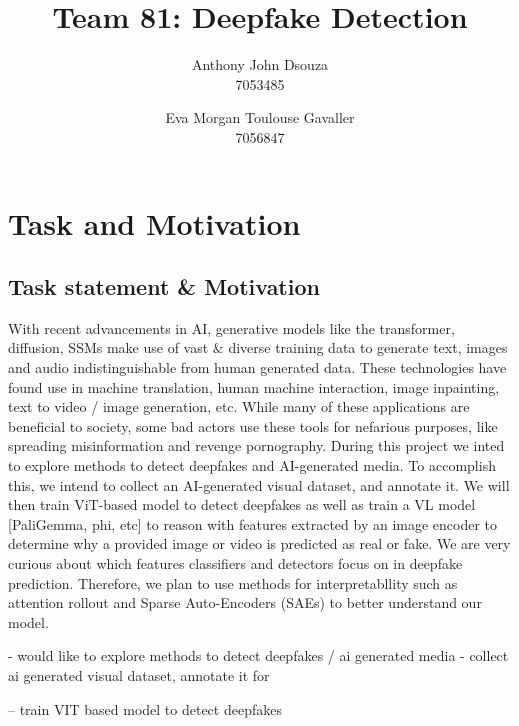 \documentclass[10pt,twocolumn,letterpaper]{article}
\begin{document}
\title{Team 81: Deepfake Detection}

\author{
Anthony John Dsouza\\
7053485\\
\and
Eva Morgan Toulouse Gavaller\\
7056847\\
}
\maketitle

\section{Task and Motivation}
\subsection{Task statement \& Motivation}
With recent advancements in AI, generative models like the transformer, diffusion, SSMs make use of vast \& diverse training data to generate text, images and audio indistinguishable from human generated data. These technologies have found use in machine translation, human machine interaction, image inpainting, text to video / image generation, etc. While many of these applications are beneficial to society, some bad actors use these tools for nefarious purposes, like spreading misinformation and revenge pornography. 
During this project we inted to explore methods to detect deepfakes and AI-generated media. To accomplish this, we intend to collect an AI-generated visual dataset, and annotate it. We will then train ViT-based model to detect deepfakes as well as train a VL model [PaliGemma, phi, etc] to reason with features extracted by an image encoder to determine why a provided image or video is predicted as real or fake. We are very curious about which features classifiers and detectors focus on in deepfake prediction. 
Therefore, we plan to use methods for interpretabllity such as attention rollout and Sparse Auto-Encoders (SAEs) to better understand our model. 

- would like to explore methods to detect deepfakes / ai generated media 
- collect ai generated visual dataset, annotate it for 


-- train VIT based model to detect deepfakes
\end{document}

